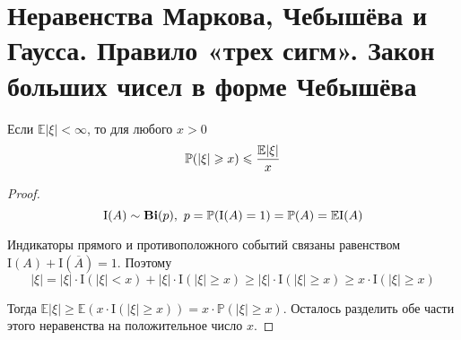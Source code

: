 \section{Неравенства Маркова, Чебышёва и Гаусса. Правило «трех сигм». Закон больших чисел в форме Чебышёва}
\begin{namedthm}
    Если $\mathbb{E}|\xi| < \infty$, то для любого $x > 0$
    \begin{equation*}
        {\mathbb{P}(|\xi| \geqslant x)} \leqslant \frac{\mathbb{E}|\xi|}{x}
    \end{equation*}
\end{namedthm}

\begin{proof}
\begin{equation*}
    \mathrm{I}(A) \sim \mathbf{Bi}(p),~ p = {\mathbb{P}(\mathrm{I}(A) = 1)} = {\mathbb{P}(A)} = \mathbb{E}\mathrm{I}(A)
\end{equation*}

Индикаторы прямого и противоположного событий связаны равенством $\mathrm{I}(A) + \mathrm{I}(\overline{A}) = 1.$ Поэтому
\begin{equation*}
    |\xi|=|\xi| \cdot \mathrm{I}(|\xi|<x)+|\xi| \cdot \mathrm{I}(|\xi| \geqslant x) \geqslant|\xi| \cdot \mathrm{I}(|\xi| \geqslant x) \geqslant x \cdot \mathrm{I}(|\xi| \geqslant x)
\end{equation*}

Тогда $\mathbb{E}|\xi| \geqslant \mathbb{E}(x \cdot \mathrm{I}(|\xi| \geqslant x))=x \cdot \mathbb{P}(|\xi| \geqslant x)$. Осталось разделить обе части этого неравенства на положительное число $x$.
\end{proof}

